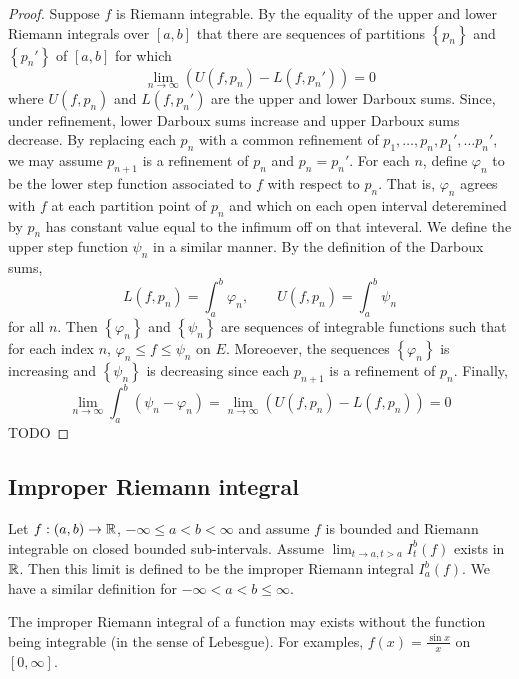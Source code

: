\begin{proof}
	Suppose $f$ is Riemann integrable.
	By the equality of the upper and lower Riemann integrals over $[a,b]$
	that there are sequences of partitions $\left\{ p_n \right\}$
	and $\left\{ p_n' \right\}$ of $[a,b]$ for which
	\[\lim_{n \to \infty} \left( U(f, p_n) - L(f, p_n') \right) = 0\]
	where $U(f,p_n)$ and $L(f,p_n')$ are the upper and lower Darboux sums.
	Since, under refinement, lower Darboux sums increase and upper Darboux sums
	decrease. By replacing each $p_n$ with a common refinement of
	$p_1, \ldots, p_n, \allowbreak p_1', \ldots p_n'$, we may assume
	$p_{n+1}$ is a refinement of $p_n$ and $p_n = p_n'$.
	For each $n$, define $\varphi_n$
	to be the lower step function associated to $f$ with respect to $p_n$.
	That is, $\varphi_n$ agrees with $f$ at each partition point
	of $p_n$ and which on each open interval deteremined by $p_n$ has
	constant value equal to the infimum off on that inteveral.
	We define the upper step function $\psi_n$ in a similar manner.
	By the definition of the Darboux sums,
	\[
		L\left( f, p_n \right)
		= \int_a^b \varphi_n, \qquad
		U\left( f, p_n \right)
		= \int_a^b \psi_n
	\]
	for all $n$.
	Then $\left\{ \varphi_n \right\}$ and $\left\{ \psi_n \right\}$ are
	sequences of integrable functions such that for each index $n$,
	$\varphi_n \leq f \leq \psi_n$ on $E$.
	Moreoever, the sequences $\left\{ \varphi_n \right\}$ is increasing
	and $\left\{ \psi_n \right\}$ is decreasing since each $p_{n+1}$ is a
	refinement of $p_n$.
	Finally,
	\[
		\lim_{n \to \infty}
		\int_a^b \left( \psi_n - \varphi_n \right)
		= \lim_{n \to \infty}
		\left( U(f,p_n) - L(f,p_n) \right)
		= 0
	\]
	TODO
\end{proof}

\subsection{Improper Riemann integral}

\begin{definition}
	Let $f: (a,b) \to \mathbb{R}$, $-\infty \leq a < b < \infty$ and assume $f$
	is bounded and Riemann integrable on closed bounded sub-intervals.
	Assume $\lim_{t \to a, t > a} I_t^b(f)$ exists in $\mathbb{R}$.
	Then this limit is defined to be the improper Riemann integral
	$I_a^b(f)$.
	We have a similar definition for $-\infty < a < b \leq \infty$.
\end{definition}

The improper Riemann integral of a function may exists without the function
being integrable (in the sense of Lebesgue).
For examples, $f(x) = \frac{\sin x}x$ on $[0, \infty]$.


